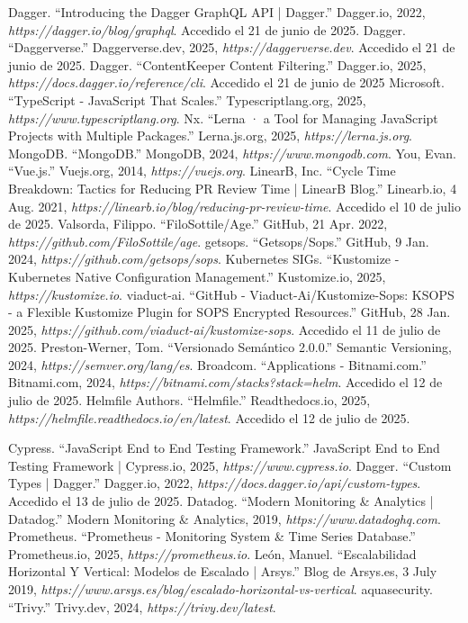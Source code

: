 \begin{thebibliography}{99}
 Dagger. ``Introducing the Dagger GraphQL API | Dagger.'' Dagger.io, 2022, {\it https://dagger.io/blog/graphql}. Accedido el 21 de junio de 2025.
 Dagger. ``Daggerverse.'' Daggerverse.dev, 2025, {\it https://daggerverse.dev}. Accedido el 21 de junio de 2025.
 Dagger. ``ContentKeeper Content Filtering.'' Dagger.io, 2025, {\it https://docs.dagger.io/reference/cli}. Accedido el 21 de junio de 2025
 Microsoft. ``TypeScript - JavaScript That Scales.'' Typescriptlang.org, 2025, {\it https://www.typescriptlang.org}.
 Nx. ``Lerna · a Tool for Managing JavaScript Projects with Multiple Packages.'' Lerna.js.org, 2025, {\it https://lerna.js.org}.
 MongoDB. ``MongoDB.'' MongoDB, 2024, {\it https://www.mongodb.com}.
 You, Evan. ``Vue.js.'' Vuejs.org, 2014, {\it https://vuejs.org}.
 LinearB, Inc. ``Cycle Time Breakdown: Tactics for Reducing PR Review Time | LinearB Blog.'' Linearb.io, 4 Aug. 2021, {\it https://linearb.io/blog/reducing-pr-review-time}. Accedido el 10 de julio de 2025.
 Valsorda, Filippo. ``FiloSottile/Age.'' GitHub, 21 Apr. 2022, {\it https://github.com/FiloSottile/age}.
 getsops. ``Getsops/Sops.'' GitHub, 9 Jan. 2024, {\it https://github.com/getsops/sops}.
 Kubernetes SIGs. ``Kustomize - Kubernetes Native Configuration Management.'' Kustomize.io, 2025, {\it https://kustomize.io}.
 viaduct-ai. ``GitHub - Viaduct-Ai/Kustomize-Sops: KSOPS - a Flexible Kustomize Plugin for SOPS Encrypted Resources.'' GitHub, 28 Jan. 2025, {\it https://github.com/viaduct-ai/kustomize-sops}. Accedido el 11 de julio de 2025.
 Preston-Werner, Tom. ``Versionado Semántico 2.0.0.'' Semantic Versioning, 2024, {\it https://semver.org/lang/es}.
 Broadcom. ``Applications - Bitnami.com.'' Bitnami.com, 2024, {\it https://bitnami.com/stacks?stack=helm}. Accedido el 12 de julio de 2025.
 Helmfile Authors. ``Helmfile.'' Readthedocs.io, 2025, {\it https://helmfile.readthedocs.io/en/latest}. Accedido el 12 de julio de 2025.

 Cypress. ``JavaScript End to End Testing Framework.'' JavaScript End to End Testing Framework | Cypress.io, 2025, {\it https://www.cypress.io}.
 Dagger. ``Custom Types | Dagger.'' Dagger.io, 2022, {\it https://docs.dagger.io/api/custom-types}. Accedido el 13 de julio de 2025.
 Datadog. ``Modern Monitoring \& Analytics | Datadog.'' Modern Monitoring \& Analytics, 2019, {\it https://www.datadoghq.com}.
 Prometheus. ``Prometheus - Monitoring System \& Time Series Database.'' Prometheus.io, 2025, {\it https://prometheus.io}.
 León, Manuel. ``Escalabilidad Horizontal Y Vertical: Modelos de Escalado | Arsys.'' Blog de Arsys.es, 3 July 2019, {\it https://www.arsys.es/blog/escalado-horizontal-vs-vertical}.
 aquasecurity. ``Trivy.'' Trivy.dev, 2024, {\it https://trivy.dev/latest}.
\end{thebibliography}

